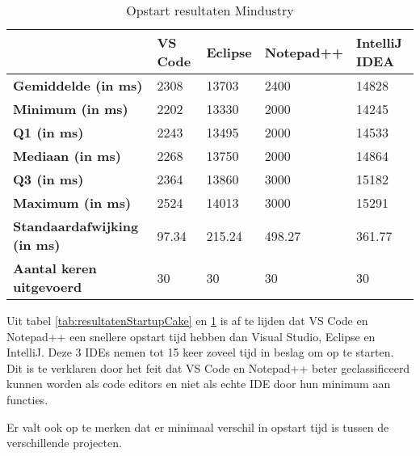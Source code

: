\begin{table}[h!]
	\centering
	\begin{tabular}{ l l l l l }
		\hline
		                                    & \textbf{VS Code} & \textbf{Eclipse} & \textbf{Notepad++} & \textbf{IntelliJ IDEA} \\
		\hline
		\textbf{Gemiddelde (in ms)}         & 2308             & 13703            & 2400               & 14828                  \\[1ex]

		\textbf{Minimum (in ms) }           & 2202             & 13330            & 2000               & 14245                  \\
		\textbf{Q1 (in ms)}                 & 2243             & 13495            & 2000               & 14533                  \\
		\textbf{Mediaan (in ms)}            & 2268             & 13750            & 2000               & 14864                  \\
		\textbf{Q3 (in ms)}                 & 2364             & 13860            & 3000               & 15182                  \\
		\textbf{Maximum (in ms)}            & 2524             & 14013            & 3000               & 15291                  \\[1ex]

		\textbf{Standaardafwijking (in ms)} & 97.34            & 215.24           & 498.27             & 361.77                 \\
		\textbf{Aantal keren uitgevoerd}    & 30               & 30               & 30                 & 30                     \\
		\hline
	\end{tabular}
	\caption{Opstart resultaten Mindustry}
	\label{tab:resultatenStartupMindustry}
\end{table}

Uit tabel \ref{tab:resultatenStartupCake} en \ref{tab:resultatenStartupMindustry} is af te lijden dat VS Code en Notepad++ een snellere opstart tijd hebben dan Visual Studio, Eclipse en IntelliJ. Deze 3 IDEs nemen  tot 15 keer zoveel tijd in beslag om op te starten. Dit is te verklaren door het feit dat VS Code en Notepad++ beter geclassificeerd kunnen worden als code editors en niet als echte IDE door hun minimum aan functies. 

Er valt ook op te merken dat er minimaal verschil in opstart tijd is tussen de verschillende projecten.

\newpage

